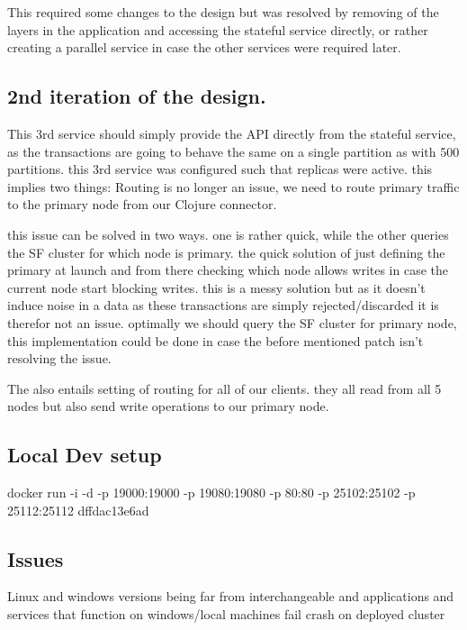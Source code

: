 \documentclass[a4paper,10pt,titlepage]{report}
\begin{document}
This required some changes to the design but was resolved by removing of the layers in the application and accessing the stateful service directly, or rather creating a parallel service in case the other services were required later.

\subsection{2nd iteration of the design.}

This 3rd service should simply provide the API directly from the stateful service, as the transactions are going to behave the same on a single partition as with 500 partitions. this 3rd service was configured such that replicas were active. this implies two things: Routing is no longer an issue, we need to route primary traffic to the primary node from our Clojure connector.

this issue can be solved in two ways. one is rather quick, while the other queries the SF cluster for which node is primary. the quick solution of just defining the primary at launch and from there checking which node allows writes in case the current node start blocking writes. this is a messy solution but as it doesn't induce noise in a data as these transactions are simply rejected/discarded it is therefor not an issue. optimally we should query the SF cluster for primary node, this implementation could be done in case the before mentioned patch isn't resolving the issue.



The also entails setting of routing for all of our clients. they all read from all 5 nodes but also send write operations to our primary node. 


\subsection{Local Dev setup}

docker run -i -d -p 19000:19000 -p 19080:19080 -p 80:80 -p 25102:25102 -p 25112:25112 dffdac13e6ad



\subsection{Issues}


Linux and windows versions being far from interchangeable and applications and services that function on windows/local machines fail crash on deployed cluster
\end{document}
